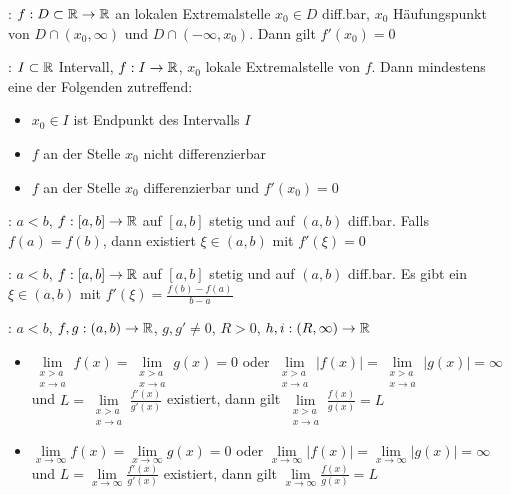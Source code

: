 \Satz {}: $f: D \subset \mathbb{R} \to \mathbb{R}$ an lokalen Extremalstelle
$x_0 \in D$ diff.bar, $x_0$ Häufungspunkt von $D \cap (x_0, \infty)$ und $D \cap (-\infty, x_0)$.
Dann gilt $f'(x_0) = 0$

\Satz {}: $I \subset \mathbb{R}$ Intervall, $f: I \to \mathbb{R}$,
$x_0$ lokale Extremalstelle von $f$. Dann mindestens eine der Folgenden zutreffend:
\vspace{-0.6em}
\begin{itemize}
    \item $x_0 \in I$ ist Endpunkt des Intervalls $I$
    \item $f$ an der Stelle $x_0$ nicht differenzierbar
    \item $f$ an der Stelle $x_0$ differenzierbar und $f'(x_0) = 0$
\end{itemize}

\Satz {}: $a < b$, $f: [a, b] \to \mathbb{R}$ auf $[a, b]$ stetig und auf $(a, b)$ diff.bar.
Falls $f(a) = f(b)$, dann existiert $\xi \in (a, b)$ mit $f'(\xi) = 0$

\Satz {}: $a < b$, $f: [a, b] \to \mathbb{R}$ auf $[a, b]$ stetig und auf $(a, b)$ diff.bar.
Es gibt ein $\xi \in (a, b)$ mit $f'(\xi) = \frac{f(b) - f(a)}{b - a}$

\Satz {}: $a < b$, $f, g: (a, b) \to \mathbb{R}$, $g, g' \ne 0$, $R > 0$, $h, i: (R, \infty) \to \mathbb{R}$
\begin{itemize}
    \item $\lim\limits_{\substack{x > a \\ x \to a}} f(x) = \lim\limits_{\substack{x > a \\ x \to a}} g(x) = 0$ oder 
    $\lim\limits_{\substack{x > a \\ x \to a}} |f(x)| = \lim\limits_{\substack{x > a \\ x \to a}} |g(x)| = \infty$
    und $L = \lim\limits_{\substack{x > a \\ x \to a}} \frac{f'(x)}{g'(x)}$ existiert,
    dann gilt $\lim\limits_{\substack{x > a \\ x \to a}} \frac{f(x)}{g(x)} = L$
    \item $\lim\limits_{x\to\infty} f(x) = \lim\limits_{x\to\infty} g(x) = 0$ oder
    $\lim\limits_{x\to\infty} |f(x)| = \lim\limits_{x\to\infty} |g(x)| = \infty$
    und $L = \lim\limits_{x\to\infty} \frac{f'(x)}{g'(x)}$ existiert,
    dann gilt $\lim\limits_{x\to\infty} \frac{f(x)}{g(x)} = L$
\end{itemize}

